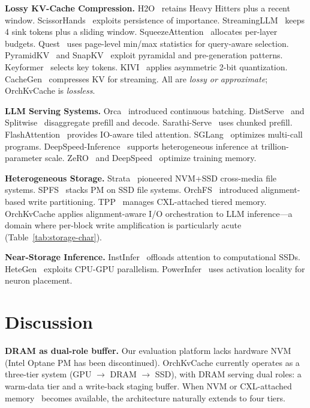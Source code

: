 \documentclass[conference]{IEEEtran}
\begin{document}
\textbf{Lossy KV-Cache Compression.} H2O~\cite{h2o} retains Heavy Hitters plus a recent window. ScissorHands~\cite{scissorhands} exploits persistence of importance. StreamingLLM~\cite{streamingllm} keeps 4 sink tokens plus a sliding window. SqueezeAttention~\cite{squeezeattention} allocates per-layer budgets. Quest~\cite{quest} uses page-level min/max statistics for query-aware selection. PyramidKV~\cite{pyramidkv} and SnapKV~\cite{snapkv} exploit pyramidal and pre-generation patterns. Keyformer~\cite{keyformer} selects key tokens. KIVI~\cite{kivi} applies asymmetric 2-bit quantization. CacheGen~\cite{cachegen} compresses KV for streaming. All are \emph{lossy or approximate}; OrchKvCache is \emph{lossless}.

\textbf{LLM Serving Systems.} Orca~\cite{orca} introduced continuous batching. DistServe~\cite{distserve} and Splitwise~\cite{splitwise} disaggregate prefill and decode. Sarathi-Serve~\cite{sarathi} uses chunked prefill. FlashAttention~\cite{flashattn,flashattn2} provides IO-aware tiled attention. SGLang~\cite{sglang} optimizes multi-call programs. DeepSpeed-Inference~\cite{deepspeed-inf} supports heterogeneous inference at trillion-parameter scale. ZeRO~\cite{zero} and DeepSpeed~\cite{deepspeed} optimize training memory.

\textbf{Heterogeneous Storage.} Strata~\cite{strata} pioneered NVM+SSD cross-media file systems. SPFS~\cite{spfs} stacks PM on SSD file systems. OrchFS~\cite{orchfs} introduced alignment-based write partitioning. TPP~\cite{tpp} manages CXL-attached tiered memory. OrchKvCache applies alignment-aware I/O orchestration to LLM inference---a domain where per-block write amplification is particularly acute (Table~\ref{tab:storage-char}).

\textbf{Near-Storage Inference.} InstInfer~\cite{instinfer} offloads attention to computational SSDs. HeteGen~\cite{hetegen} exploits CPU-GPU parallelism. PowerInfer~\cite{powerinfer} uses activation locality for neuron placement.

\section{Discussion}

\textbf{DRAM as dual-role buffer.} Our evaluation platform lacks hardware NVM (Intel Optane PM has been discontinued). OrchKvCache currently operates as a three-tier system (GPU $\to$ DRAM $\to$ SSD), with DRAM serving dual roles: a warm-data tier and a write-back staging buffer. When NVM or CXL-attached memory~\cite{tpp} becomes available, the architecture naturally extends to four tiers.
\end{document}
